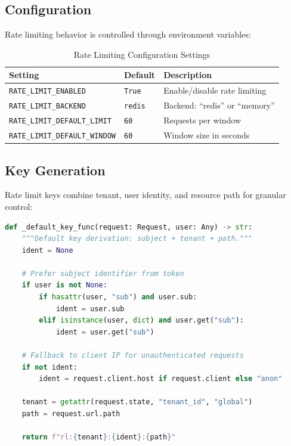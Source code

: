 \subsection{Configuration}
\label{subsec:rate-limit-config}

Rate limiting behavior is controlled through environment variables:

\begin{table}[ht]
\centering
\caption{Rate Limiting Configuration Settings}
\label{tab:rate-limit-config}
\begin{tabular}{lll}
\hline
\textbf{Setting} & \textbf{Default} & \textbf{Description} \\
\hline
\texttt{RATE\_LIMIT\_ENABLED} & \texttt{True} & Enable/disable rate limiting \\
\texttt{RATE\_LIMIT\_BACKEND} & \texttt{redis} & Backend: ``redis'' or ``memory'' \\
\texttt{RATE\_LIMIT\_DEFAULT\_LIMIT} & \texttt{60} & Requests per window \\
\texttt{RATE\_LIMIT\_DEFAULT\_WINDOW} & \texttt{60} & Window size in seconds \\
\hline
\end{tabular}
\end{table}

\subsection{Key Generation}
\label{subsec:rate-limit-keys}

Rate limit keys combine tenant, user identity, and resource path for granular control:

\begin{lstlisting}[language=Python,caption={Rate limit key derivation}]
def _default_key_func(request: Request, user: Any) -> str:
    """Default key derivation: subject + tenant + path."""
    ident = None
    
    # Prefer subject identifier from token
    if user is not None:
        if hasattr(user, "sub") and user.sub:
            ident = user.sub
        elif isinstance(user, dict) and user.get("sub"):
            ident = user.get("sub")
    
    # Fallback to client IP for unauthenticated requests
    if not ident:
        ident = request.client.host if request.client else "anon"
    
    tenant = getattr(request.state, "tenant_id", "global")
    path = request.url.path
    
    return f"rl:{tenant}:{ident}:{path}"
\end{lstlisting}


